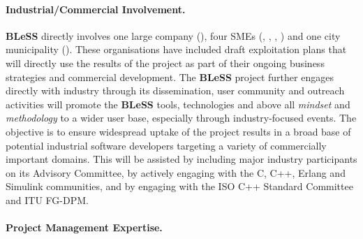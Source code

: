 \documentclass[a4paper,11pt]{article}
\newcommand{\project}[1]{\textbf{#1}\xspace}
\newcommand{\BLESS}{\project{BLeSS}}
\newcommand{\TheProject}{\BLESS}
\begin{document}
\paragraph{Industrial/Commercial Involvement.}

\TheProject{} directly involves one large company (\IBMshort{}), 
four SMEs (\PRLshort{}, \CODEPLAYshort{}, \GOLEMshort{},  \SCCHshort{}) and one city municipality (\JMOICshort{}).
These organisations have included draft exploitation plans that will directly use the results of the project
as part of their ongoing business strategies and commercial development.
The \TheProject{} project further engages directly with industry through its
dissemination, user community and outreach activities 
will promote the
\TheProject{} tools, technologies and above all \emph{mindset} and \emph{methodology} to a wider user base,
especially through industry-focused events. %
The objective is to ensure widespread uptake of the project results in a broad base of potential industrial
software developers targeting a variety of commercially important domains. %
This will be assisted by including major industry participants on its Advisory Committee,
by actively engaging with the C, C++, Erlang and Simulink communities, and by engaging with the ISO C++ Standard Committee and ITU FG-DPM.


\paragraph{Project Management Expertise.}
\end{document}
